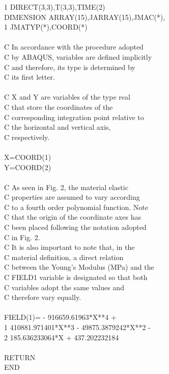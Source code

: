 {1 DIRECT(3,3),T(3,3),TIME(2)\\
DIMENSION ARRAY(15),JARRAY(15),JMAC(*),\\
1 JMATYP(*),COORD(*)\\\\
C In accordance with the procedure adopted \\
C by ABAQUS, variables are defined implicitly\\
C and therefore, its type is determined by \\
C its first letter.\\\\
C X and Y are variables of the type real \\
C that store the coordinates of the \\
C corresponding integration point relative to\\
C the horizontal and vertical axis, \\
C respectively.\\\\
X=COORD(1)\\
Y=COORD(2)\\\\
C As seen in Fig. 2, the material elastic\\ 
C properties are assumed to vary according\\
C to a fourth order polynomial function. Note\\
C that the origin of the coordinate axes has\\
C been placed following the notation adopted\\ 
C in Fig. 2.\\
C It is also important to note that, in the\\ 
C material definition, a direct relation \\ 
C between the Young's Modulus (MPa) and the\\
C FIELD1 variable is designated so that both\\ 
C variables adopt the same values and \\
C therefore vary equally.\\\\
FIELD(1)= - 916659.61963*X**4 +\\
1 410881.971401*X**3 - 49875.3879242*X**2 -\\
2 185.636233064*X + 437.202232184\\\\
RETURN\\
END\\\\
}

